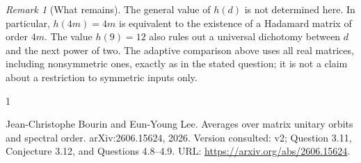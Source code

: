 \documentclass[10pt,a4paper]{article}
\theoremstyle{remark}
\newtheorem{remark}[theorem]{Remark}
\begin{document}
\begin{remark}[What remains]
The general value of $h(d)$ is not determined here. In particular, $h(4m)=4m$ is equivalent to the existence of a Hadamard matrix of order $4m$. The value $h(9)=12$ also rules out a universal dichotomy between $d$ and the next power of two. The adaptive comparison above uses all real matrices, including nonsymmetric ones, exactly as in the stated question; it is not a claim about a restriction to symmetric inputs only.
\end{remark}

\begin{thebibliography}{1}

Jean-Christophe Bourin and Eun-Young Lee.
\newblock Averages over matrix unitary orbits and spectral order.
\newblock arXiv:2606.15624, 2026.
\newblock Version consulted: v2; Question 3.11, Conjecture 3.12, and Questions
  4.8--4.9.
\newblock URL: \url{https://arxiv.org/abs/2606.15624}.

\end{thebibliography}
\end{document}
